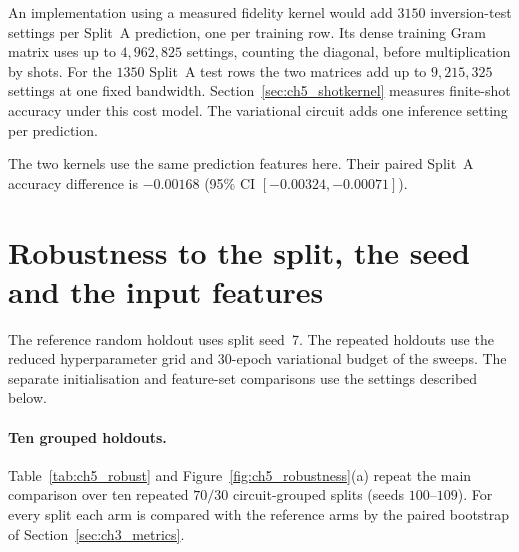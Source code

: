 \documentclass[Thesis.tex]{subfiles}
\begin{document}
An implementation using a measured fidelity kernel would add $3150$
inversion-test settings per Split~A prediction, one per training row. Its
dense training Gram matrix uses up to $4{,}962{,}825$ settings, counting the
diagonal, before multiplication by shots. For the $1350$ Split~A test rows the
two matrices add up to $9{,}215{,}325$ settings at one fixed bandwidth.
Section~\ref{sec:ch5_shotkernel} measures finite-shot accuracy under this cost
model. The variational circuit adds one inference setting per prediction.

The two kernels use the same prediction features here. Their paired Split~A
accuracy difference is $-0.00168$ (95\% CI $[-0.00324,\allowbreak -0.00071]$).

\section{Robustness to the split, the seed and the input features}
\label{sec:ch5_robustness}

The reference random holdout uses split seed~7. The repeated holdouts use the
reduced hyperparameter grid and $30$-epoch variational budget of the sweeps.
The separate initialisation and feature-set comparisons use the settings
described below.

\paragraph{Ten grouped holdouts.} Table~\ref{tab:ch5_robust} and
Figure~\ref{fig:ch5_robustness}(a) repeat the main comparison over ten repeated
$70/30$ circuit-grouped splits (seeds $100$--$109$). For every split each arm is
compared with the reference arms by the paired bootstrap of
Section~\ref{sec:ch3_metrics}.
\end{document}
